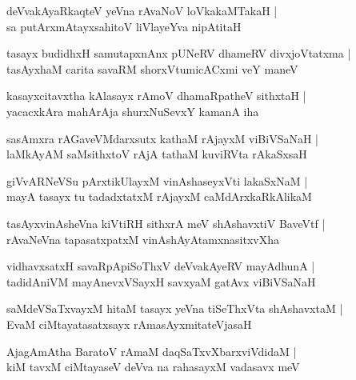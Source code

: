 \begin{shloka}
deVvakAyaRkaqteV yeVna rAvaNoV loVkakaMTakaH |\\
sa putArxmAtayxsahitoV liVlayeYva nipAtitaH 
\end{shloka}

\begin{shloka}
tasayx budidhxH samutapxnAnx pUNeRV dhameRV divxjoVtatxma |\\
tasAyxhaM carita savaRM shorxVtumicACxmi veY maneV 
\end{shloka}

\begin{shloka}
kasayxcitavxtha kAlasayx rAmoV dhamaRpatheV sithxtaH |\\
yacacxkAra mahArAja shurxNuSevxY kamanA iha
\end{shloka}

\begin{shloka}
sasAmxra rAGaveVMdarxsutx kathaM rAjayxM viBiVSaNaH |\\
laMkAyAM saMsithxtoV rAjA tathaM kuviRVta rAkaSxsaH 
\end{shloka}

\begin{shloka}
giVvARNeVSu pArxtikUlayxM vinAshaseyxVti lakaSxNaM |\\
mayA tasayx tu tadadxtatxM rAjayxM caMdArxkaRkAlikaM 
\end{shloka}

\begin{shloka}
tasAyxvinAsheVna kiVtiRH sithxrA meV shAshavxtiV BaveVtf |\\
rAvaNeVna tapasatxpatxM vinAshAyAtamxnasitxvXha 
\end{shloka}

\begin{shloka}
vidhavxsatxH savaRpApiSoThxV deVvakAyeRV mayAdhunA |\\
tadidAniVM mayAnevxVSayxH savxyaM gatAvx viBiVSaNaH 
\end{shloka}

\begin{shloka}
saMdeVSaTxvayxM hitaM tasayx yeVna tiSeThxVta shAshavxtaM |\\
EvaM ciMtayatasatxsayx rAmasAyxmitateVjasaH 
\end{shloka}

\begin{shloka}
AjagAmAtha BaratoV rAmaM daqSaTxvXbarxviVdidaM |\\
kiM tavxM ciMtayaseV deVva na rahasayxM vadasavx meV 
\end{shloka}

